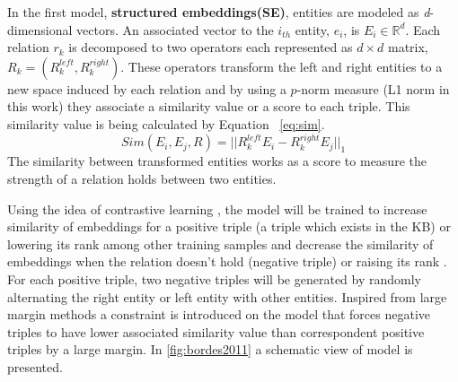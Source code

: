    In the first model, \textbf{structured embeddings(SE)}, entities are modeled as \textit{d}-dimensional vectors.
    An associated vector to the $i_{th}$ entity, $e_{i}$, is $E_{i} \in \mathbb{R}^{d}$. Each relation $r_{k}$  
    is decomposed to two operators each represented as $d \times d$ matrix, $ R_k = (R_{k}^{left}, R_{k}^{right})$. 
    These operators transform the left and right entities to a new space induced by each relation and by using 
    a $p$-norm measure  (L1 norm in this work) they associate a similarity value or a score to each triple. 
    This similarity value is being calculated by
    Equation ~\eqref{eq:sim}. 
    \begin{equation}
    \label{eq:sim}Sim(E_{i}, E_{j}, R) = ||R_{k}^{left}E_{i} - R_{k}^{right}E_{j} ||_{1}
    \end{equation}
    The similarity between transformed entities works as a score to measure the strength of a relation holds between two entities. 
      
    Using the idea of contrastive learning , the model will be trained to increase similarity of 
    embeddings for a positive triple (a triple which exists in the KB) or lowering its rank among other training samples
    and decrease the similarity of embeddings when the relation doesn't hold (negative triple) or raising its rank . 
    For each positive triple, two negative triples will be generated by randomly alternating the right entity or left entity with other entities.
    Inspired from large margin methods a constraint is introduced on the model
    that forces negative triples to have lower associated similarity value  than correspondent 
    positive triples by a large margin. In \autoref{fig:bordes2011} a schematic
    view of model is presented.
    
